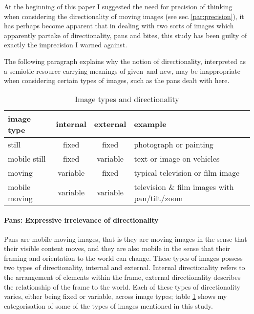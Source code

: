 \documentclass[11pt, oneside, a4paper]{scrartcl}
\newcommand{\nw} {{\sc new}}
\newcommand{\gv} {{\sc given}}
\begin{document}
\bigskip

At the beginning of this paper I suggested the need for precision of thinking when considering the directionality of moving images (see sec.\,\ref{par:precision}), it has perhaps become apparent that in dealing with two sorts of images which apparently partake of directionality, pans and bites, this study has been guilty of exactly the imprecision I warned against. 

The following paragraph explains why the notion of directionality, interpreted as a semiotic resource carrying meanings of \gv\ and \nw, may be inappropriate when considering certain types of images, such as the pans dealt with here.  

\begin{table}[tb]
  \centering
  \begin{tabular}{@{} lccl @{}}
    \toprule
    image type & internal & external & example\\ 
    \midrule
    {\sc still} & fixed & fixed & photograph or painting\\ 
    {\sc mobile still} & fixed & variable & text or image on vehicles\\ 
    {\sc moving} & variable & fixed & typical television or film image\\ 
    {\sc mobile moving} & variable & variable & television \& film images with pan/tilt/zoom\\ 
    \bottomrule
  \end{tabular}
  \caption{Image types and directionality\label{tab:imagetypes}}
\end{table}

\paragraph{Pans: Expressive irrelevance of directionality}
Pans are mobile moving images, that is they are moving images in the sense that their visible content moves, and they are also mobile in the sense that their framing and orientation to the world can change. These types of images possess two types of directionality, internal and external. Internal directionality refers to the arrangement of elements within the frame, external directionality describes the relationship of the frame to the world. Each of these types of directionality varies, either being fixed or variable, across image types; table \ref{tab:imagetypes} shows my categorisation of some of the types of images mentioned in this study.
\end{document}
